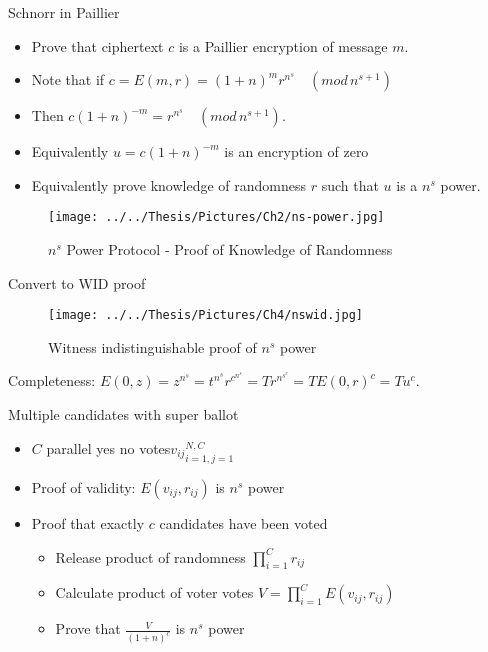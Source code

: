 \documentclass{beamer}
\newcommand{\md}[1]{\quad (mod \, {#1})}
\begin{document}
\begin{frame}[allowframebreaks]{Schnorr in Paillier}
\begin{itemize}
\item  Prove that ciphertext $c$ is a Paillier encryption of  message $m$. 
\item  Note that if $c=E(m,r) = (1+n)^m r^{n^s} \md{n^{s+1}}$ 
\item  Then $c(1+n)^{-m} = r^{n^s} \md{n^{s+1}}$. 
\item  Equivalently $u=c(1+n)^{-m}$ is an encryption of zero
\item  Equivalently prove knowledge of randomness $r$ such that $u$ is a $n^s$ power.  
\end{itemize}
\begin{figure}[htbp]
\centering
\texttt{[image: ../../Thesis/Pictures/Ch2/ns-power.jpg]} 
\caption{$n^s$ Power Protocol - Proof of Knowledge of Randomness}
\end{figure}
\end{frame}

\begin{frame}{Convert to WID proof}
\begin{figure}[htbp]
\centering
\texttt{[image: ../../Thesis/Pictures/Ch4/nswid.jpg]} 
\caption{Witness indistinguishable proof of $n^s$ power \cite{Damgard2003}}
\label{fig:nswid}
\end{figure}
Completeness: $E(0,z)=z^{n^s}=t^{n^s} r^{c^{n^s}} = Tr^{n^{s^c}}=TE(0,r)^c=Tu^c$.
\end{frame}

\begin{frame}{Multiple candidates with super ballot}
\begin{itemize}
\item $C$ parallel yes no votes${v_{ij}}_{i=1,j=1}^{N,C}$
\item Proof of validity: $E(v_{ij},r_{ij})$ is   $n^s$ power
\item Proof that exactly $c$ candidates have been voted
\begin{itemize}
\item Release product of randomness $\prod_{i=1}^C r_{ij}$
\item Calculate product of voter votes $V=\prod_{i=1}^C  E(v_{ij},r_{ij})$
\item Prove that $\frac{V}{(1+n)^c}$ is  $n^s$ power
\end{itemize}
\end{itemize}
\end{frame}
\end{document}

